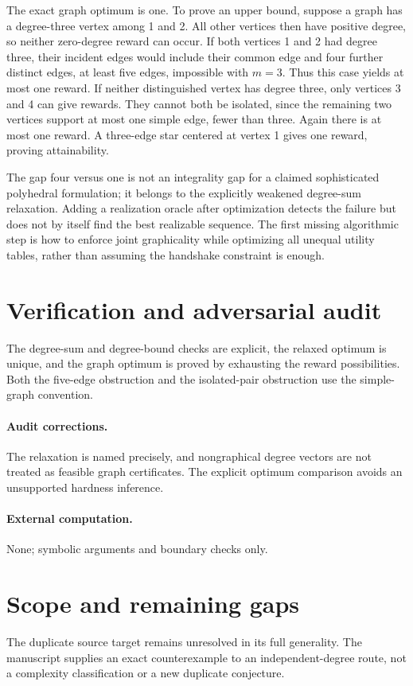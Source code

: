 \documentclass[11pt]{article}
\begin{document}
The exact graph optimum is one. To prove an upper bound, suppose a graph has a degree-three vertex among 1 and 2. All other vertices then have positive degree, so neither zero-degree reward can occur. If both vertices 1 and 2 had degree three, their incident edges would include their common edge and four further distinct edges, at least five edges, impossible with $m=3$. Thus this case yields at most one reward. If neither distinguished vertex has degree three, only vertices 3 and 4 can give rewards. They cannot both be isolated, since the remaining two vertices support at most one simple edge, fewer than three. Again there is at most one reward. A three-edge star centered at vertex 1 gives one reward, proving attainability.

The gap four versus one is not an integrality gap for a claimed sophisticated polyhedral formulation; it belongs to the explicitly weakened degree-sum relaxation. Adding a realization oracle after optimization detects the failure but does not by itself find the best realizable sequence. The first missing algorithmic step is how to enforce joint graphicality while optimizing all unequal utility tables, rather than assuming the handshake constraint is enough.
\section{Verification and adversarial audit}
The degree-sum and degree-bound checks are explicit, the relaxed optimum is unique, and the graph optimum is proved by exhausting the reward possibilities. Both the five-edge obstruction and the isolated-pair obstruction use the simple-graph convention.
\paragraph{Audit corrections.} The relaxation is named precisely, and nongraphical degree vectors are not treated as feasible graph certificates. The explicit optimum comparison avoids an unsupported hardness inference.
\paragraph{External computation.} None; symbolic arguments and boundary checks only.
\section{Scope and remaining gaps}
The duplicate source target remains unresolved in its full generality. The manuscript supplies an exact counterexample to an independent-degree route, not a complexity classification or a new duplicate conjecture.
\end{document}
